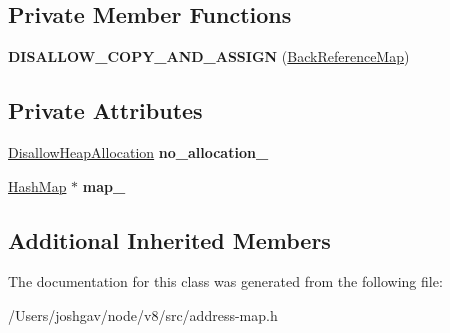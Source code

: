 \subsection*{Private Member Functions}
\begin{DoxyCompactItemize}
\item 
{\bfseries D\+I\+S\+A\+L\+L\+O\+W\+\_\+\+C\+O\+P\+Y\+\_\+\+A\+N\+D\+\_\+\+A\+S\+S\+I\+GN} (\hyperlink{classv8_1_1internal_1_1_back_reference_map}{Back\+Reference\+Map})\hypertarget{classv8_1_1internal_1_1_back_reference_map_a23d7c38dd86b2f1efdd2236a688d0882}{}\label{classv8_1_1internal_1_1_back_reference_map_a23d7c38dd86b2f1efdd2236a688d0882}

\end{DoxyCompactItemize}
\subsection*{Private Attributes}
\begin{DoxyCompactItemize}
\item 
\hyperlink{classv8_1_1internal_1_1_per_thread_assert_scope_debug_only}{Disallow\+Heap\+Allocation} {\bfseries no\+\_\+allocation\+\_\+}\hypertarget{classv8_1_1internal_1_1_back_reference_map_a3468e744eda28250064407c870d8231d}{}\label{classv8_1_1internal_1_1_back_reference_map_a3468e744eda28250064407c870d8231d}

\item 
\hyperlink{classv8_1_1internal_1_1_template_hash_map_impl}{Hash\+Map} $\ast$ {\bfseries map\+\_\+}\hypertarget{classv8_1_1internal_1_1_back_reference_map_a002049fa4074d9d921001b252b83b314}{}\label{classv8_1_1internal_1_1_back_reference_map_a002049fa4074d9d921001b252b83b314}

\end{DoxyCompactItemize}
\subsection*{Additional Inherited Members}


The documentation for this class was generated from the following file\+:\begin{DoxyCompactItemize}
\item 
/\+Users/joshgav/node/v8/src/address-\/map.\+h\end{DoxyCompactItemize}
